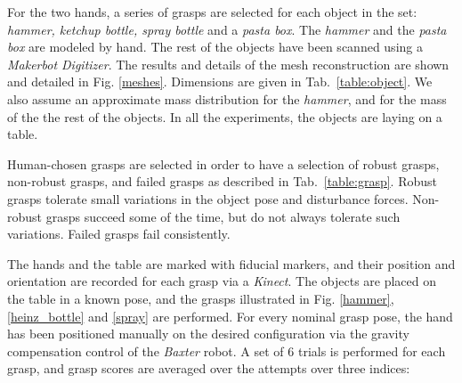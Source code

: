For the two hands, a series of grasps are selected for each object in the set:
\emph{hammer, ketchup bottle, spray bottle} and a \emph{pasta box}.
The \emph{hammer} and the \emph{pasta box} are modeled by hand. The rest of the objects have been scanned using a \emph{Makerbot Digitizer}. The results and details of the mesh reconstruction are shown and detailed in Fig. \ref{meshes}.
Dimensions are given in Tab.~\ref{table:object}.
We also assume an approximate mass distribution for the \emph{hammer}, and for the mass of the the rest of the objects.
In all the experiments, the objects are laying on a table.


Human-chosen grasps are selected in order to have a selection of robust grasps, non-robust grasps, and failed grasps as described in Tab.~\ref{table:grasp}. Robust grasps tolerate small variations in the object pose and disturbance forces. Non-robust grasps succeed some of the time, but do not always tolerate such variations.  Failed grasps fail consistently.  

The hands and the table are marked with fiducial markers, and their position and orientation are recorded for each grasp via a \emph{Kinect}. The objects are placed on the table in a known pose, and the grasps illustrated in Fig. \ref{hammer}, \ref{heinz_bottle} and \ref{spray} are performed. For every nominal grasp pose, the hand has been positioned manually on the desired configuration via the gravity compensation control of the \emph{Baxter} robot. A set of $6$ trials is performed for each grasp, and grasp scores are averaged over the attempts over three indices:

